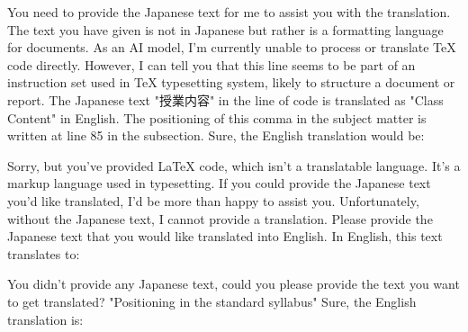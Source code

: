 \relax
\providecommand\hyper@newdestlabel[2]{}
You need to provide the Japanese text for me to assist you with the translation. The text you have given is not in Japanese but rather is a formatting language for documents.
As an AI model, I'm currently unable to process or translate TeX code directly. However, I can tell you that this line seems to be part of an instruction set used in TeX typesetting system, likely to structure a document or report. The Japanese text "授業内容" in the line of code is translated as "Class Content" in English.
The positioning of this comma in the subject matter is written at line 85 in the subsection.
Sure, the English translation would be:

Sorry, but you've provided LaTeX code, which isn't a translatable language. It's a markup language used in typesetting. If you could provide the Japanese text you'd like translated, I'd be more than happy to assist you.
Unfortunately, without the Japanese text, I cannot provide a translation. Please provide the Japanese text that you would like translated into English.
In English, this text translates to:

You didn't provide any Japanese text, could you please provide the text you want to get translated?
"Positioning in the standard syllabus"
Sure, the English translation is:

